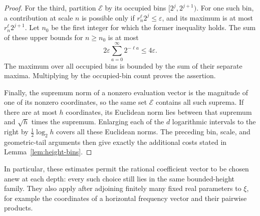 \begin{proof}
For the third, partition $\mathcal E$ by its occupied bins
$[2^j,2^{j+1})$.  For one such bin, a contribution at scale $n$ is possible
only if $r_n^\ell2^j\le\varepsilon$, and its maximum is at most
$r_n^\ell2^{j+1}$.  Let $n_0$ be the first integer for which the former
inequality holds.  The sum of these upper bounds for $n\ge n_0$ is at most
\[
 2\varepsilon\sum_{a=0}^{\infty}2^{-\ell a}
       \le4\varepsilon.
\]
The maximum over all occupied bins is bounded by the sum of their separate
maxima.  Multiplying by the occupied-bin count proves the assertion.

Finally, the supremum norm of a nonzero evaluation vector is the magnitude
of one of its nonzero coordinates, so the same set $\mathcal E$ contains
all such suprema.  If there are at most $h$ coordinates, its Euclidean norm
lies between that supremum and $\sqrt h$ times the supremum.  Enlarging each
of the $d$ logarithmic intervals to the right by
$\tfrac12\log_2h$ covers all these Euclidean norms.  The preceding bin,
scale, and geometric-tail arguments then give exactly the additional costs
stated in Lemma~\ref{lem:height-bins}.
\end{proof}

In particular, these estimates permit the rational coefficient vector to
be chosen anew at each depth: every such choice still lies in the same
bounded-height family.  They also apply after adjoining finitely many fixed
real parameters to $\xi$, for example the coordinates of a horizontal
frequency vector and their pairwise products.

